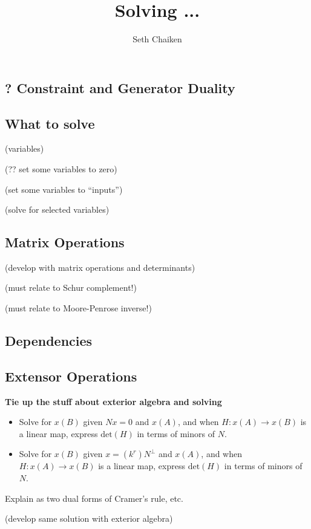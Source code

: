 \documentclass{article}
\title{Solving ... }
\author{Seth Chaiken}
\begin{document}
\maketitle
\subsection{? Constraint and Generator Duality}


\subsection{What to solve}

(variables) ~\cite{OMBOOK}

(?? set some variables to zero)

(set some variables to ``inputs'')

(solve for selected variables) 

\subsection{Matrix Operations}

(develop with matrix operations and determinants)


(must relate to Schur complement!)

(must relate to Moore-Penrose inverse!)

\subsection{Dependencies}
\subsection{Extensor Operations}


{\bf 
Tie up the stuff about exterior algebra
and solving 
\begin{itemize}
\item
Solve for $x(B)$ given $Nx=0$ and $x(A)$, and
when $H:x(A)\rightarrow x(B)$ is a linear map, 
express $\text{det}(H)$ in terms of minors of $N$.
\item
Solve for $x(B)$ given $x = (k^r)N^{\perp}$ and $x(A)$, and
when $H:x(A)\rightarrow x(B)$ is a linear map, 
express $\text{det}(H)$ in terms of minors of $N$.
\end{itemize}

Explain as two dual forms of Cramer's rule, etc.
}

(develop same solution with exterior algebra)
\end{document}
